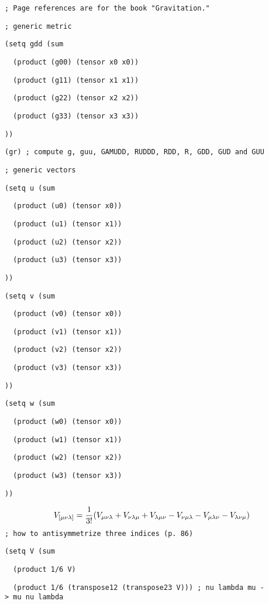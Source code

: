 \parindent=0pt
{\tt ;\ Page\ references\ are\ for\ the\ book\ "Gravitation."}

{\tt ;\ generic\ metric}

{\tt (setq\ gdd\ (sum}

{\tt \ \ (product\ (g00)\ (tensor\ x0\ x0))}

{\tt \ \ (product\ (g11)\ (tensor\ x1\ x1))}

{\tt \ \ (product\ (g22)\ (tensor\ x2\ x2))}

{\tt \ \ (product\ (g33)\ (tensor\ x3\ x3))}

{\tt ))}

{\tt (gr)\ ;\ compute\ g,\ guu,\ GAMUDD,\ RUDDD,\ RDD,\ R,\ GDD,\ GUD\ and\ GUU}

{\tt ;\ generic\ vectors}

{\tt (setq\ u\ (sum}

{\tt \ \ (product\ (u0)\ (tensor\ x0))}

{\tt \ \ (product\ (u1)\ (tensor\ x1))}

{\tt \ \ (product\ (u2)\ (tensor\ x2))}

{\tt \ \ (product\ (u3)\ (tensor\ x3))}

{\tt ))}

{\tt (setq\ v\ (sum}

{\tt \ \ (product\ (v0)\ (tensor\ x0))}

{\tt \ \ (product\ (v1)\ (tensor\ x1))}

{\tt \ \ (product\ (v2)\ (tensor\ x2))}

{\tt \ \ (product\ (v3)\ (tensor\ x3))}

{\tt ))}

{\tt (setq\ w\ (sum}

{\tt \ \ (product\ (w0)\ (tensor\ x0))}

{\tt \ \ (product\ (w1)\ (tensor\ x1))}

{\tt \ \ (product\ (w2)\ (tensor\ x2))}

{\tt \ \ (product\ (w3)\ (tensor\ x3))}

{\tt ))}

$$V_{[\mu\nu\lambda]}={1\over3!}
(V_{\mu\nu\lambda}
+V_{\nu\lambda\mu}
+V_{\lambda\mu\nu}
-V_{\nu\mu\lambda}
-V_{\mu\lambda\nu}
-V_{\lambda\nu\mu}
)$$
{\tt ;\ how\ to\ antisymmetrize\ three\ indices\ (p.\ 86)}

{\tt (setq\ V\ (sum}

{\tt \ \ (product\ 1/6\ V)}

{\tt \ \ (product\ 1/6\ (transpose12\ (transpose23\ V)))\ ;\ nu\ lambda\ mu\ ->\ mu\ nu\ lambda}

